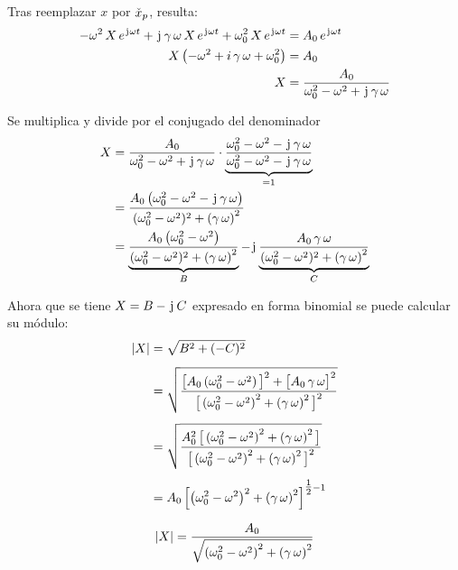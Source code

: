 Tras reemplazar $x$ por $\check{x}_p$, resulta:
\begin{align*}
    - \omega^2 \, X \, e^{\mkern2mu\mathrm{j}\mkern1mu \omega t} + \mkern2mu\mathrm{j}\mkern1mu \, \gamma \, \omega \, X \, e^{\mkern2mu\mathrm{j}\mkern1mu \omega t} + \omega_0^2 \, X \, e^{\mkern2mu\mathrm{j}\mkern1mu \omega t} &= A_0 \, e^{\mkern2mu\mathrm{j}\mkern1mu \omega t}
    \\
    X \left( - \omega^2 + i \, \gamma \, \omega + \omega_0^2 \right) &= A_0
    \\
    X &= \frac{A_0}{\omega_0^2 - \omega^2 + \mkern2mu\mathrm{j}\mkern1mu \, \gamma \, \omega}
\end{align*}

Se multiplica y divide por el conjugado del denominador
\begin{align*}
    X &= \frac{A_0}{\omega_0^2 - \omega^2 + \mkern2mu\mathrm{j}\mkern1mu \, \gamma \, \omega} \cdot \underbrace{\frac{\omega_0^2 - \omega^2 - \mkern2mu\mathrm{j}\mkern1mu \, \gamma \, \omega}{\omega_0^2 - \omega^2 - \mkern2mu\mathrm{j}\mkern1mu \, \gamma \, \omega}}_{=1}
    \\
    &= \frac{A_0 \left( \omega_0^2 - \omega^2 - \mkern2mu\mathrm{j}\mkern1mu \, \gamma \, \omega \right)}{(\omega_0^2 - \omega^2)^2 + \left( \gamma \, \omega \right)^2}
    \\
    &= \underbrace{\frac{A_0 \left( \omega_0^2 - \omega^2 \right)}{(\omega_0^2 - \omega^2)^2 + \left( \gamma \, \omega \right)^2}}_B - \mkern2mu\mathrm{j}\mkern1mu \underbrace{\frac{A_0 \, \gamma \, \omega}{(\omega_0^2 - \omega^2)^2 + \left( \gamma \, \omega \right)^2}}_C
\end{align*}

Ahora que se tiene $X = B - \mkern2mu\mathrm{j}\mkern1mu \, C$ expresado en forma binomial se puede calcular su módulo:
\begin{align*}
    {\left| {X} \right|} &= \sqrt{B^2+(-C)^2}
    \\[1ex]
    &= \sqrt{\frac{\big[A_0 \left( \omega_0^2 - \omega^2 \right) \big]^2 + \big[ A_0 \, \gamma \, \omega \big]^2}{\big[ \left( \omega_0^2 - \omega^2 \right)^2 + \left( \gamma \, \omega \right)^2 \big]^2}}
    \\[1ex]
    &= \sqrt{\frac{A_0^2 \, \big[ \left( \omega_0^2 - \omega^2 \right)^2 + \left( \gamma \, \omega \right)^2 \big]}{\big[ \left(\omega_0^2 - \omega^2 \right)^2 + \left( \gamma \, \omega \right)^2 \big]^2}}
    \\[1ex]
    &= A_0 \left[ \left(\omega_0^2 - \omega^2 \right)^2 + \left( \gamma \, \omega \right)^2 \right]^{\tfrac{1}{2}-1}
\end{align*}

\begin{mdframed}[style=DefinitionFrame]
    \begin{defn}
    \end{defn}
    \begin{equation*}
        {\left| {X} \right|} = \frac{A_0}{\sqrt{ \left(\omega_0^2 - \omega^2 \right)^2 + \left( \gamma \, \omega \right)^2}}
    \end{equation*}
\end{mdframed}

